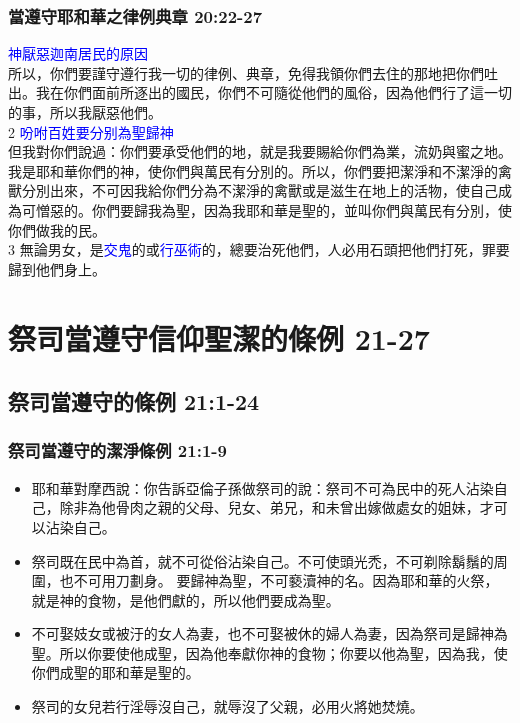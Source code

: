 \subsubsection{當遵守耶和華之律例典章 20:22-27}
 \textcolor{blue}{神厭惡迦南居民的原因}\\
所以，你們要謹守遵行我一切的律例、典章，免得我領你們去住的那地把你們吐出。我在你們面前所逐出的國民，你們不可隨從他們的風俗，因為他們行了這一切的事，所以我厭惡他們。\\
2 \textcolor{blue}{吩咐百姓要分别為聖歸神}\\
但我對你們說過：你們要承受他們的地，就是我要賜給你們為業，流奶與蜜之地。我是耶和華你們的神，使你們與萬民有分別的。所以，你們要把潔淨和不潔淨的禽獸分別出來，不可因我給你們分為不潔淨的禽獸或是滋生在地上的活物，使自己成為可憎惡的。你們要歸我為聖，因為我耶和華是聖的，並叫你們與萬民有分別，使你們做我的民。\\
3 無論男女，是\textcolor{blue}{交鬼}的或\textcolor{blue}{行巫術}的，總要治死他們，人必用石頭把他們打死，罪要歸到他們身上。

\section{祭司當遵守信仰聖潔的條例 21-27}
\subsection{祭司當遵守的條例 21:1-24}
\noindent
\subsubsection{祭司當遵守的潔淨條例 21:1-9}
\begin{itemize} 
\itemsep-.35em
\item 耶和華對摩西說：你告訴亞倫子孫做祭司的說：祭司不可為民中的死人沾染自己，除非為他骨肉之親的父母、兒女、弟兄，和未曾出嫁做處女的姐妹，才可以沾染自己。
\item 祭司既在民中為首，就不可從俗沾染自己。不可使頭光禿，不可剃除鬍鬚的周圍，也不可用刀劃身。 要歸神為聖，不可褻瀆神的名。因為耶和華的火祭，就是神的食物，是他們獻的，所以他們要成為聖。
\item 不可娶妓女或被汙的女人為妻，也不可娶被休的婦人為妻，因為祭司是歸神為聖。所以你要使他成聖，因為他奉獻你神的食物；你要以他為聖，因為我，使你們成聖的耶和華是聖的。
\item 祭司的女兒若行淫辱沒自己，就辱沒了父親，必用火將她焚燒。
\end{itemize}

